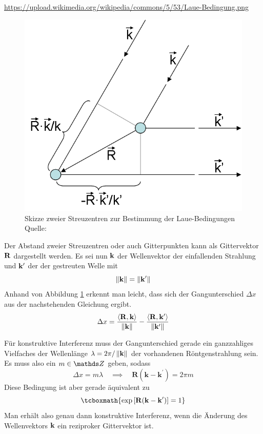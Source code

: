 			\url{https://upload.wikimedia.org/wikipedia/commons/5/53/Laue-Bedingung.png}
			\begin{figure}[tb]
				\centering
				\includegraphics[scale=0.7]{images/Laue-Bedingung.png}
				\caption{Skizze zweier Streuzentren zur Bestimmung der Laue-Bedingungen \\ Quelle: }
				\label{fig:laue-bedingungen}
			\end{figure}

			Der Abstand zweier Streuzentren oder auch Gitterpunkten kann als Gittervektor $\bf{R}$ dargestellt werden.
			Es sei nun $\bf{k}$ der Wellenvektor der einfallenden Strahlung und $\bf{k}^\prime$ der der gestreuten Welle mit
			\[
				\left\| \bf{k} \right\| = \left\| \bf{k}^\prime \right\|
			\]
			Anhand von Abbildung \ref{fig:laue-bedingungen} erkennt man leicht, dass sich der Gangunterschied $\Delta x$ aus der nachstehenden Gleichung ergibt.
			\[
				\Delta x = \frac{\left\langle \bf{R},\bf{k} \right\rangle}{\left\| \bf{k} \right\|} - \frac{\left\langle \bf{R},\bf{k}^\prime \right\rangle}{\left\| \bf{k}^\prime \right\|}
			\]

			Für konstruktive Interferenz muss der Gangunterschied gerade ein ganzzahliges Vielfaches der Wellenlänge $\lambda = 2\pi/\left\| \bf{k} \right\|$ der vorhandenen Röntgenstrahlung sein.
			Es muss also ein $m\in\SZ$ geben, sodass
			\[
				\Delta x = m\lambda \quad \implies \quad \mathbf{R}(\mathbf{k}-\mathbf{k}^\prime) = 2\pi m
			\]
			Diese Bedingung ist aber gerade äquivalent zu 
			\[
				\tcboxmath{ \exp\boxb{ \mathbf{R}(\mathbf{k}-\mathbf{k}^\prime) } = 1 }
			\]
			Man erhält also genau dann konstruktive Interferenz, wenn die Änderung des Wellenvektors $\bf{k}$ ein reziproker Gittervektor ist.


